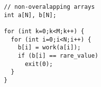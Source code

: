 \begin{lstlisting}[morekeywords={g_qCount},belowskip=0pt]
// non-overalapping arrays
int a[N], b[N];

for (int k=0;k<M;k++) {
  for (int i=0;i<N;i++) {
    b[i] = work(a[i]);
    if (b[i] == rare_value)
      exit(0);
  }
}
\end{lstlisting}
